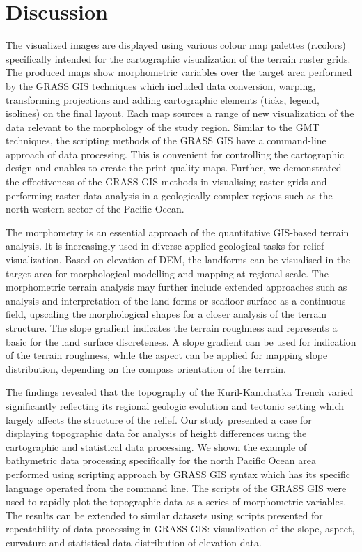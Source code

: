 \documentclass[technologies,article,submit,pdftex,moreauthors]{Definitions/mdpi}
\begin{document}
\section{Discussion}

The visualized images are displayed using various colour map palettes (r.colors) specifically intended for the cartographic visualization of the terrain raster grids. The produced maps show morphometric variables over the target area performed by the GRASS GIS techniques which included data conversion, warping, transforming projections and adding cartographic elements (ticks, legend, isolines) on the final layout. Each map sources a range of new visualization of the data relevant to the morphology of the study region. Similar to the GMT techniques, the scripting methods  of the GRASS GIS have a command-line approach of data processing. This is convenient for controlling the cartographic design and enables to create the print-quality maps. Further, we demonstrated the effectiveness of the GRASS GIS methods in visualising raster grids and performing raster data analysis in a geologically complex regions such as the north-western sector of the Pacific Ocean.

The morphometry is an essential approach of the quantitative GIS-based terrain analysis. It is increasingly used in diverse applied geological tasks for relief visualization. Based on elevation of DEM, the landforms can be visualised in the target area for morphological modelling and mapping at regional scale. The morphometric terrain analysis may further include extended approaches such as analysis and interpretation of the land forms or seafloor surface as a continuous field, upscaling the morphological shapes for a closer analysis of the terrain structure. The slope gradient indicates the terrain roughness and represents a basic for the land surface discreteness. A slope gradient can be used for indication of the terrain roughness, while the aspect can be applied for mapping slope distribution, depending on the compass orientation of the terrain. 

The findings revealed that the topography of the Kuril-Kamchatka Trench varied significantly reflecting its regional geologic evolution and tectonic setting which largely affects the structure of the relief. Our study presented a case for displaying topographic data for analysis of height differences using the cartographic and statistical data processing. We shown the example of bathymetric data processing specifically for the north Pacific Ocean area performed using scripting approach by GRASS GIS syntax which has its specific language operated from the command line. The scripts of the GRASS GIS were used to rapidly plot the topographic data as a series of morphometric variables. The results can be extended to similar datasets using scripts presented for repeatability of data processing in GRASS GIS: visualization of the slope, aspect, curvature and statistical data distribution of elevation data.
\end{document}
